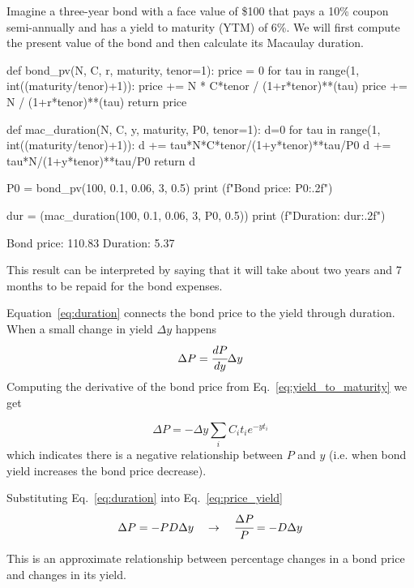 Imagine a three-year bond with a face value of \$100 that pays a 10\% coupon semi-annually and has a yield to maturity (YTM) of 6\%. We will first compute the present value of the bond and then calculate its Macaulay duration.

\begin{ipythonnon}
def bond_pv(N, C, r, maturity, tenor=1):
    price = 0
    for tau in range(1, int((maturity/tenor)+1)):
        price += N * C*tenor / (1+r*tenor)**(tau)
    price += N / (1+r*tenor)**(tau)
    return price

def mac_duration(N, C, y, maturity, P0, tenor=1): 
    d=0
    for tau in range(1, int((maturity/tenor)+1)):
        d += tau*N*C*tenor/(1+y*tenor)**tau/P0
    d += tau*N/(1+y*tenor)**tau/P0 
    return d

P0 = bond_pv(100, 0.1, 0.06, 3, 0.5)
print (f"Bond price: {P0:.2f}")

dur = (mac_duration(100, 0.1, 0.06, 3, P0, 0.5))
print (f"Duration: {dur:.2f}")
\end{ipythonnon}
\begin{ioutput}
Bond price: 110.83
Duration: 5.37
\end{ioutput}

This result can be interpreted by saying that it will take about two years and 7 months to be repaid for the bond expenses.

Equation~\ref{eq:duration} connects the bond price to the yield through duration. When a small change in yield $\Delta y$ happens
\begin{equation}
\Delta P = \cfrac{dP}{dy}\Delta y
\label{eq:price_1st_order}
\end{equation}
\noindent
Computing the derivative of the bond price from Eq.~\ref{eq:yield_to_maturity} we get

\begin{equation}
\Delta P = -\Delta y\sum_i C_i t_i e^{-yt_i}
\label{eq:price_yield}
\end{equation}
\noindent
which indicates there is a negative relationship between $P$ and $y$ (i.e. when bond yield increases the bond price decrease). 

Substituting Eq.~\ref{eq:duration} into Eq.~\ref{eq:price_yield} 
\begin{equation}
\Delta P = -PD\Delta y \quad\rightarrow\quad \cfrac{\Delta P}{P} = -D\Delta y
\label{eq:price_sens}
\end{equation}

This is an approximate relationship between percentage changes in a bond price and changes in its yield.

